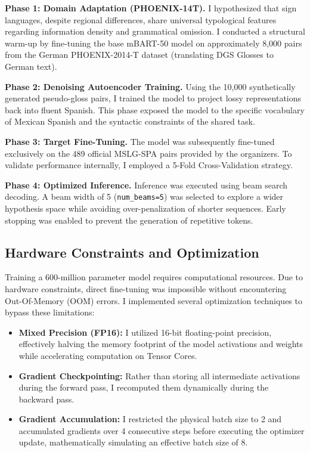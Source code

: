 \documentclass[11pt,a4paper,english]{ceurart}
\begin{document}
\textbf{Phase 1: Domain Adaptation (PHOENIX-14T).} I hypothesized that sign languages, despite regional differences, share universal typological features regarding information density and grammatical omission. I conducted a structural warm-up by fine-tuning the base mBART-50 model on approximately 8,000 pairs from the German PHOENIX-2014-T dataset (translating DGS Glosses to German text).

\textbf{Phase 2: Denoising Autoencoder Training.} Using the 10,000 synthetically generated pseudo-gloss pairs, I trained the model to project lossy representations back into fluent Spanish. This phase exposed the model to the specific vocabulary of Mexican Spanish and the syntactic constraints of the shared task.

\textbf{Phase 3: Target Fine-Tuning.} The model was subsequently fine-tuned exclusively on the 489 official MSLG-SPA pairs provided by the organizers. To validate performance internally, I employed a 5-Fold Cross-Validation strategy.

\textbf{Phase 4: Optimized Inference.} Inference was executed using beam search decoding. A beam width of 5 (\texttt{num\_beams=5}) was selected to explore a wider hypothesis space while avoiding over-penalization of shorter sequences. Early stopping was enabled to prevent the generation of repetitive tokens.

\subsection{Hardware Constraints and Optimization}
Training a 600-million parameter model requires computational resources. Due to hardware constraints, direct fine-tuning was impossible without encountering Out-Of-Memory (OOM) errors. I implemented several optimization techniques to bypass these limitations:
\begin{itemize}
    \item \textbf{Mixed Precision (FP16):} I utilized 16-bit floating-point precision, effectively halving the memory footprint of the model activations and weights while accelerating computation on Tensor Cores.
    \item \textbf{Gradient Checkpointing:} Rather than storing all intermediate activations during the forward pass, I recomputed them dynamically during the backward pass.
    \item \textbf{Gradient Accumulation:} I restricted the physical batch size to 2 and accumulated gradients over 4 consecutive steps before executing the optimizer update, mathematically simulating an effective batch size of 8.
\end{itemize}
\end{document}

